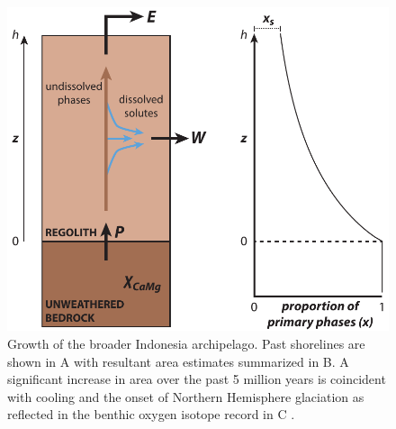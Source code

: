 \documentclass[11pt,letterpaper]{article}
\begin{document}
\begin{figure}
    \centering
    \includegraphics{Manuscript/Figures/regolith_schematic.pdf}
    \caption{Growth of the broader Indonesia archipelago. Past shorelines are shown in A with resultant area estimates summarized in B. A significant increase in area over the past 5 million years is coincident with cooling and the onset of Northern Hemisphere glaciation as reflected in the benthic oxygen isotope record in C \cite{Zachos2008a}.}
    \label{fig:my_label}
\end{figure}

\clearpage
\newpage
\footnotesize

\singlespacing



\end{document}
